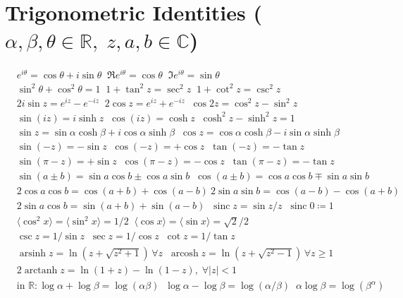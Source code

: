 \section*{Trigonometric Identities \normalfont\scriptsize{($\alpha,\beta,\theta\in\mathbb{R},\; z,a,b\in\mathbb{C}$)}}
\begin{align*}
&e^{i\theta}=\cos\theta+i\sin\theta \;\; \Re e^{i\theta}=\cos\theta \;\; \Im e^{i\theta}=\sin\theta \\
&\sin^2\theta+\cos^2\theta=1 \;\; 1+\tan^2 z=\sec^2 z \;\; 1+\cot^2z=\csc^2z \\
&2i\sin z=e^{iz}-e^{-iz} \;\; 2\cos z=e^{iz}+e^{-iz} \;\; \cos2z=\cos^2 z-\sin^2 z \\
&\sin(iz)=i\sinh z \;\; \cos(iz)=\cosh z \;\; \cosh^2z-\sinh^2z=1 \\
&\sin z=\sin\alpha\cosh\beta+i\cos\alpha\sinh\beta \;\; \cos z=\cos\alpha\cosh\beta-i\sin\alpha\sinh\beta \\
&\sin(-z)=-\sin z \;\; \cos(-z)=+\cos z \;\; \tan(-z)=-\tan z \\
&\sin(\pi-z)=+\sin z \;\; \cos(\pi-z)=-\cos z \;\; \tan(\pi-z)=-\tan z \\
&\sin(a\pm b)=\sin a\cos b\pm\cos a\sin b \;\; \cos(a\pm b)=\cos a\cos b\mp\sin a\sin b \\
&2\cos a\cos b=\cos(a+b)+\cos(a-b) \ 2\sin a\sin b=\cos(a\!-\!b)-\cos(a\!+\!b) \\
&2\sin a\cos b=\sin(a+b)+\sin(a-b) \;\; \operatorname{sinc}z=\sin z/z \;\; \operatorname{sinc}0\coloneqq1 \\
&\langle\cos^2 x\rangle=\langle\sin^2 x\rangle=1/2 \;\; \langle\cos x\rangle=\langle\sin x\rangle=\sqrt{2}/2 \\
&\csc z=1/\sin z \;\; \sec z=1/\cos z \;\; \cot z=1/\tan z \\
&\operatorname{arsinh}z=\ln(z+\sqrt{z^2+1})\, \forall z \;\; \operatorname{arcosh}z=\ln(z+\sqrt{z^2-1})\, \forall z\geq1 \\
&2\operatorname{arctanh}z=\ln(1+z)-\ln(1-z),\; \forall |z|<1 \\
&\text{in } \!\mathbb{R}\!: \log \alpha+\log \beta=\log(\alpha\beta) \;\; \log \alpha-\log \beta=\log(\alpha/\beta) \;\; \alpha\log \beta=\log(\beta^\alpha)  
\end{align*}

